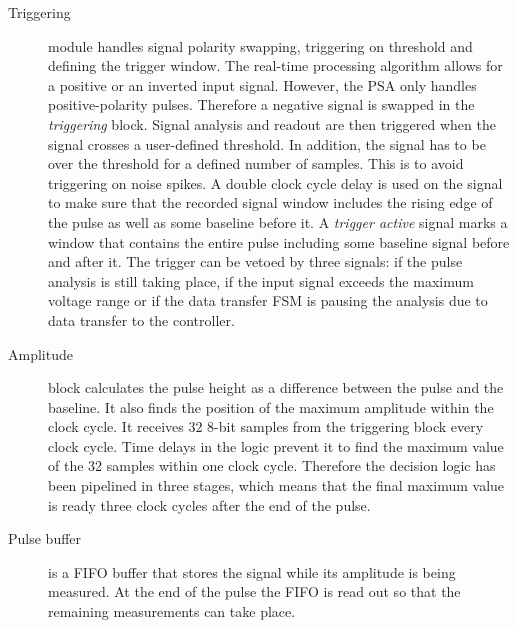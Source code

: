 \begin{description}
\item[Triggering] module handles signal polarity swapping, triggering on threshold and defining the trigger window. The real-time processing algorithm allows for a positive or an inverted input signal. However, the PSA only handles positive-polarity pulses. Therefore a negative signal is swapped in the \textit{triggering} block. Signal analysis and readout are then triggered when the signal crosses a user-defined threshold. In addition, the signal has to be over the threshold for a defined number of samples. This is to avoid triggering on noise spikes.
A double clock cycle delay is used on the signal to make sure that the recorded signal window includes the rising edge of the pulse as well as some baseline before it. A \textit{trigger active} signal marks a window that contains the entire pulse including some baseline signal before and after it. 
The trigger can be vetoed by three signals: if the pulse analysis is still taking place, if the input signal exceeds the maximum voltage range or if the data transfer FSM is pausing the analysis due to data transfer to the controller.

%


\item[Amplitude] block calculates the pulse height as a difference between the pulse and the baseline. It also finds the position of the maximum amplitude within the clock cycle. It receives 32 8-bit samples from the triggering block every clock cycle. Time delays in the logic prevent it to find the maximum value of the 32 samples within one clock cycle. Therefore the decision logic has been pipelined in three stages, which means that the final maximum value is ready three clock cycles after the end of the pulse.
\item[Pulse buffer] is a FIFO buffer that stores the signal while its amplitude is being measured. At the end of the pulse the FIFO is read out so that the remaining measurements can take place. 


\end{description}

